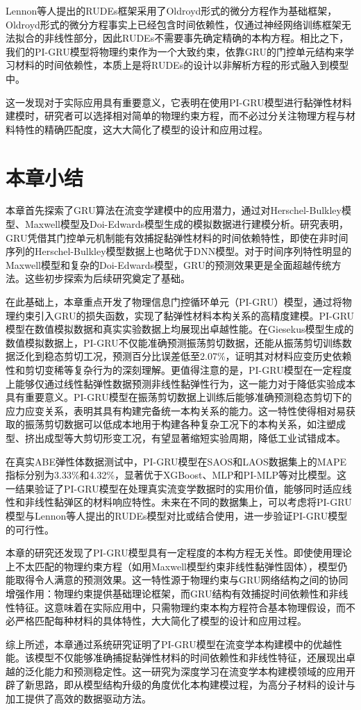 Lennon等人提出的RUDEs框架采用了Oldroyd形式的微分方程作为基础框架，Oldroyd形式的微分方程事实上已经包含时间依赖性，仅通过神经网络训练框架无法拟合的非线性部分，因此RUDEs不需要事先确定精确的本构方程\cite{lennonScientificMachineLearning2023a}。相比之下，我们的PI-GRU模型将物理约束作为一个大致约束，依靠GRU的门控单元结构来学习材料的时间依赖性，本质上是将RUDEs的设计以非解析方程的形式融入到模型中。

这一发现对于实际应用具有重要意义，它表明在使用PI-GRU模型进行黏弹性材料建模时，研究者可以选择相对简单的物理约束方程，而不必过分关注物理方程与材料特性的精确匹配度，这大大简化了模型的设计和应用过程。


\section{本章小结}

本章首先探索了GRU算法在流变学建模中的应用潜力，通过对Herschel-Bulkley模型、Maxwell模型及Doi-Edwards模型生成的模拟数据进行建模分析。研究表明，GRU凭借其门控单元机制能有效捕捉黏弹性材料的时间依赖特性，即使在非时间序列的Herschel-Bulkley模型数据上也略优于DNN模型。对于时间序列特性明显的Maxwell模型和复杂的Doi-Edwards模型，GRU的预测效果更是全面超越传统方法。这些初步探索为后续研究奠定了基础。

在此基础上，本章重点开发了物理信息门控循环单元（PI-GRU）模型，通过将物理约束引入GRU的损失函数，实现了黏弹性材料本构关系的高精度建模。PI-GRU模型在数值模拟数据和真实实验数据上均展现出卓越性能。在Giesekus模型生成的数值模拟数据上，PI-GRU不仅能准确预测振荡剪切数据，还能从振荡剪切训练数据泛化到稳态剪切工况，预测百分比误差低至2.07\%，证明其对材料应变历史依赖性和剪切变稀等复杂行为的深刻理解。更值得注意的是，PI-GRU模型在一定程度上能够仅通过线性黏弹性数据预测非线性黏弹性行为，这一能力对于降低实验成本具有重要意义。PI-GRU模型在振荡剪切数据上训练后能够准确预测稳态剪切下的应力应变关系，表明其具有构建完备统一本构关系的能力。这一特性使得相对易获取的振荡剪切数据可以低成本地用于构建各种复杂工况下的本构关系，如注塑成型、挤出成型等大剪切形变工况，有望显著缩短实验周期，降低工业试错成本。

在真实ABE弹性体数据测试中，PI-GRU模型在SAOS和LAOS数据集上的MAPE指标分别为3.33\%和4.32\%，显著优于XGBoost、MLP和PI-MLP等对比模型。这一结果验证了PI-GRU模型在处理真实流变学数据时的实用价值，能够同时适应线性和非线性黏弹区的材料响应特性。未来在不同的数据集上，可以考虑将PI-GRU模型与Lennon等人提出的RUDEs模型对比或结合使用，进一步验证PI-GRU模型的可行性。

本章的研究还发现了PI-GRU模型具有一定程度的本构方程无关性。即使使用理论上不太匹配的物理约束方程（如用Maxwell模型约束非线性黏弹性固体），模型仍能取得令人满意的预测效果。这一特性源于物理约束与GRU网络结构之间的协同增强作用：物理约束提供基础理论框架，而GRU结构有效捕捉时间依赖性和非线性特征。这意味着在实际应用中，只需物理约束本构方程符合基本物理假设，而不必严格匹配每种材料的具体特性，大大简化了模型的设计和应用过程。


综上所述，本章通过系统研究证明了PI-GRU模型在流变学本构建模中的优越性能。该模型不仅能够准确捕捉黏弹性材料的时间依赖性和非线性特征，还展现出卓越的泛化能力和预测稳定性。这一研究为深度学习在流变学本构建模领域的应用开辟了新思路，即从模型结构升级的角度优化本构建模过程，为高分子材料的设计与加工提供了高效的数据驱动方法。